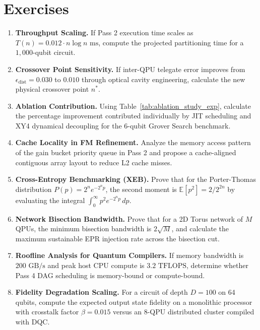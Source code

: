 
\section*{Exercises}

\begin{enumerate}[label=\textbf{11.\arabic*.}]
    \item \textbf{Throughput Scaling.} If Pass 2 execution time scales as $T(n) = 0.012 \cdot n \log n\text{ ms}$, compute the projected partitioning time for a $1,000$-qubit circuit.
    \item \textbf{Crossover Point Sensitivity.} If inter-QPU telegate error improves from $\epsilon_{\text{dist}} = 0.030$ to $0.010$ through optical cavity engineering, calculate the new physical crossover point $n^*$.
    \item \textbf{Ablation Contribution.} Using Table~\ref{tab:ablation_study_exp}, calculate the percentage improvement contributed individually by JIT scheduling and XY4 dynamical decoupling for the 6-qubit Grover Search benchmark.
    \item \textbf{Cache Locality in FM Refinement.} Analyze the memory access pattern of the gain bucket priority queue in Pass 2 and propose a cache-aligned contiguous array layout to reduce L2 cache misses.
    \item \textbf{Cross-Entropy Benchmarking (XEB).} Prove that for the Porter-Thomas distribution $P(p) = 2^n e^{-2^n p}$, the second moment is $\mathbb{E}[p^2] = 2 / 2^{2n}$ by evaluating the integral $\int_0^\infty p^2 e^{-2^n p}\,dp$.
    \item \textbf{Network Bisection Bandwidth.} Prove that for a 2D Torus network of $M$ QPUs, the minimum bisection bandwidth is $2\sqrt{M}$, and calculate the maximum sustainable EPR injection rate across the bisection cut.
    \item \textbf{Roofline Analysis for Quantum Compilers.} If memory bandwidth is $200\text{ GB/s}$ and peak host CPU compute is $3.2\text{ TFLOPS}$, determine whether Pass 4 DAG scheduling is memory-bound or compute-bound.
    \item \textbf{Fidelity Degradation Scaling.} For a circuit of depth $D = 100$ on 64 qubits, compute the expected output state fidelity on a monolithic processor with crosstalk factor $\beta = 0.015$ versus an 8-QPU distributed cluster compiled with DQC.
\end{enumerate}
